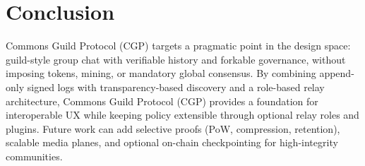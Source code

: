 \documentclass[conference]{IEEEtran}
\newcommand{\cgp}{Commons Guild Protocol (CGP)\xspace}
\begin{document}
\section{Conclusion}
\cgp targets a pragmatic point in the design space: guild-style group chat with verifiable history and forkable governance, without imposing tokens, mining, or mandatory global consensus. By combining append-only signed logs with transparency-based discovery and a role-based relay architecture, \cgp provides a foundation for interoperable UX while keeping policy extensible through optional relay roles and plugins. Future work can add selective proofs (PoW, compression, retention), scalable media planes, and optional on-chain checkpointing for high-integrity communities.

\balance


\end{document}
